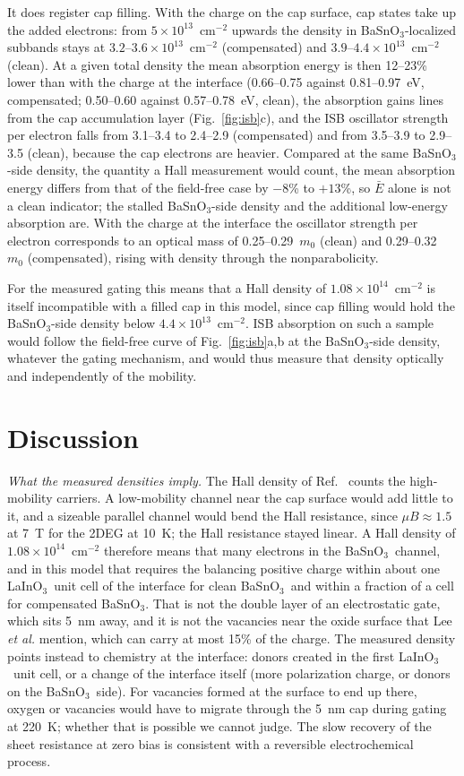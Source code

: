 \documentclass[11pt]{article}
\newcommand{\LIO}{\texorpdfstring{LaInO$_3$}{LaInO3}}
\newcommand{\BSO}{\texorpdfstring{BaSnO$_3$}{BaSnO3}}
\begin{document}
It does register cap filling. With the charge on the cap surface, cap states take up the added electrons: from $5\times10^{13}$~cm$^{-2}$ upwards the density in \BSO-localized subbands stays at $3.2$--$3.6\times10^{13}$~cm$^{-2}$ (compensated) and $3.9$--$4.4\times10^{13}$~cm$^{-2}$ (clean). At a given total density the mean absorption energy is then 12--23\% lower than with the charge at the interface (0.66--0.75 against 0.81--0.97~eV, compensated; 0.50--0.60 against 0.57--0.78~eV, clean), the absorption gains lines from the cap accumulation layer (Fig.~\ref{fig:isb}c), and the ISB oscillator strength per electron falls from 3.1--3.4 to 2.4--2.9 (compensated) and from 3.5--3.9 to 2.9--3.5 (clean), because the cap electrons are heavier. Compared at the same \BSO-side density, the quantity a Hall measurement would count, the mean absorption energy differs from that of the field-free case by $-8$\% to $+13$\%, so $\bar E$ alone is not a clean indicator; the stalled \BSO-side density and the additional low-energy absorption are. With the charge at the interface the oscillator strength per electron corresponds to an optical mass of 0.25--0.29~$m_0$ (clean) and 0.29--0.32~$m_0$ (compensated), rising with density through the nonparabolicity.

For the measured gating this means that a Hall density of $1.08\times10^{14}$~cm$^{-2}$ is itself incompatible with a filled cap in this model, since cap filling would hold the \BSO-side density below $4.4\times10^{13}$~cm$^{-2}$. ISB absorption on such a sample would follow the field-free curve of Fig.~\ref{fig:isb}a,b at the \BSO-side density, whatever the gating mechanism, and would thus measure that density optically and independently of the mobility.

\section{Discussion}\label{sec:disc}
\emph{What the measured densities imply.} The Hall density of Ref.~\cite{Lee2024LIO} counts the high-mobility carriers. A low-mobility channel near the cap surface would add little to it, and a sizeable parallel channel would bend the Hall resistance, since $\mu B\approx1.5$ at 7~T for the 2DEG at 10~K; the Hall resistance stayed linear. A Hall density of $1.08\times10^{14}$~cm$^{-2}$ therefore means that many electrons in the \BSO\ channel, and in this model that requires the balancing positive charge within about one \LIO\ unit cell of the interface for clean \BSO\ and within a fraction of a cell for compensated \BSO. That is not the double layer of an electrostatic gate, which sits 5~nm away, and it is not the vacancies near the oxide surface that Lee \emph{et al.} mention, which can carry at most 15\% of the charge. The measured density points instead to chemistry at the interface: donors created in the first \LIO\ unit cell, or a change of the interface itself (more polarization charge, or donors on the \BSO\ side). For vacancies formed at the surface to end up there, oxygen or vacancies would have to migrate through the 5~nm cap during gating at 220~K; whether that is possible we cannot judge. The slow recovery of the sheet resistance at zero bias is consistent with a reversible electrochemical process.
\end{document}
